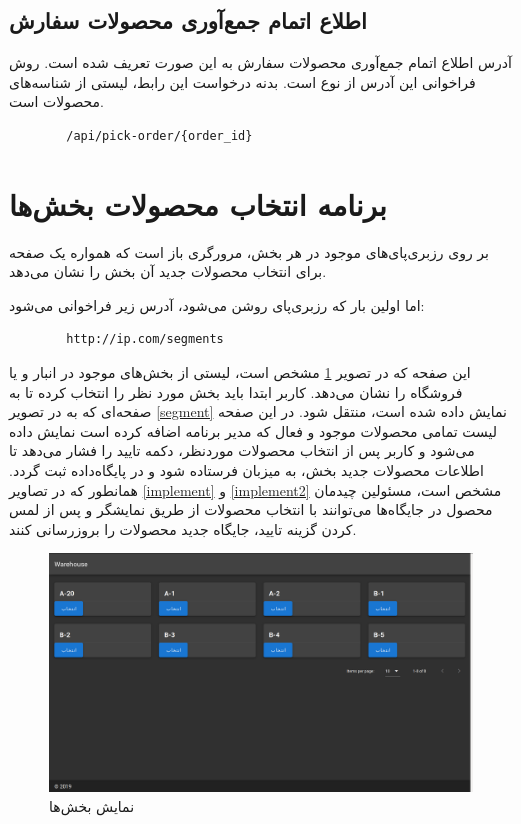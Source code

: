 \subsection{اطلاع اتمام جمع‌آوری محصولات سفارش}
آدرس اطلاع اتمام جمع‌آوری محصولات سفارش به این صورت تعریف شده است. روش فراخوانی این آدرس از نوع  است.
بدنه درخواست این رابط، لیستی از شناسه‌های محصولات است.
\begin{latin}
    \begin{lstlisting}
        /api/pick-order/{order_id}
    \end{lstlisting}
\end{latin}

\section{‌برنامه انتخاب محصولات بخش‌ها}
بر روی رزبری‌پای‌های موجود در هر بخش، مرورگری باز است که همواره یک صفحه برای انتخاب محصولات جدید آن بخش را نشان می‌دهد.

اما اولین بار که رزبری‌پای روشن می‌شود، آدرس زیر فراخوانی می‌شود:
\begin{latin}
    \begin{lstlisting}
        http://ip.com/segments
    \end{lstlisting}
\end{latin}
این صفحه که در تصویر \ref{segments} مشخص است، لیستی از بخش‌های موجود در انبار و یا فروشگاه‌ را نشان می‌دهد.
کاربر ابتدا باید بخش مورد نظر را انتخاب کرده تا به صفحه‌ای که به در تصویر \ref{segment} نمایش داده شده است، منتقل شود.
در این صفحه لیست تمامی محصولات موجود و فعال که مدیر برنامه اضافه کرده است نمایش داده می‌شود و کاربر پس از انتخاب محصولات موردنظر، دکمه تایید
را فشار می‌دهد تا اطلاعات محصولات جدید بخش، به میزبان فرستاده شود و در پایگاه‌داده ثبت گردد. همانطور که در تصاویر \ref{implement} و \ref{implement2} مشخص است، مسئولین چیدمان محصول در جایگاه‌ها می‌توانند با انتخاب محصولات از طریق نمایشگر و پس از لمس کردن گزینه تایید، جایگاه جدید محصولات را بروزرسانی کنند.
\begin{figure}[t!]
    \centering
    \includegraphics[scale=0.25]{figures/segments.png}
    \caption{نمایش بخش‌ها }
    \label{segments}
\end{figure}

